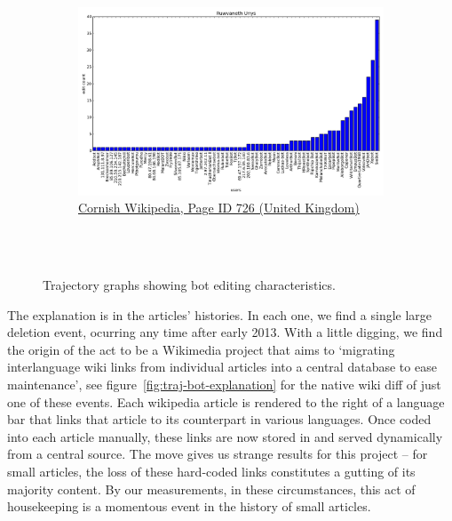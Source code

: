 \begin{figure}
{\begin{subfigure}[b!]{1.2\linewidth}
      \includegraphics[width=0.45\linewidth]{img/traj-bot/kw736users.png}
      \caption{\href{http://kw.wikipedia.org/wiki/index.php?curid=736}{Cornish
          Wikipedia, Page ID 726 (United Kingdom)}}
    \end{subfigure}
  }\\
  \vspace{5mm}
  \\
  \caption{Trajectory graphs showing bot editing characteristics.}
  \label{fig:traj-bot}
\end{figure}

The explanation is in the articles' histories. In each one, we find a
single large deletion event, ocurring any time after early 2013. With
a little digging, we find the origin of the act to be a Wikimedia
project that aims to `migrating interlanguage wiki links from
individual articles into a central database to ease
maintenance',\cite{wiki-interwikilinks} see
figure~\ref{fig:traj-bot-explanation} for the native wiki diff of just
one of these events. Each wikipedia article is rendered to the right
of a language bar that links that article to its counterpart in
various languages. Once coded into each article manually, these links
are now stored in and served dynamically from a central
source.\cite{wiki-blog-onwikidata} The move gives us strange results
for this project -- for small articles, the loss of these hard-coded
links constitutes a gutting of its majority content. By our
measurements, in these circumstances, this act of housekeeping is a
momentous event in the history of small articles.

